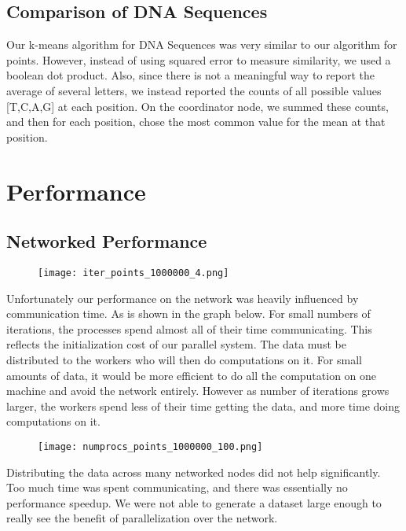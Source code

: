 \documentclass[12pt]{article}
\begin{document}
\subsection{Comparison of DNA Sequences}

Our k-means algorithm for DNA Sequences was very similar to our algorithm for points. However, instead of using squared error to measure similarity, we used a boolean dot product. Also, since there is not a meaningful way to report the average of several letters, we instead reported the counts of all possible values [T,C,A,G] at each position. On the coordinator node, we summed these counts, and then for each position, chose the most common value for the mean at that position.

\section{Performance}

\subsection{Networked Performance}

\begin{figure}[H]
\centering
\texttt{[image: iter\_points\_1000000\_4.png]}
\end{figure}


Unfortunately our performance on the network was heavily influenced by communication time. As is shown in the graph below. For small numbers of iterations, the processes spend almost all of their time communicating. This reflects the initialization cost of our parallel system. The data must be distributed to the workers who will then do computations on it. For small amounts of data, it would be more efficient to do all the computation on one machine and avoid the network entirely. However as number of iterations grows larger, the workers spend less of their time getting the data, and more time doing computations on it.



\begin{figure}[H]
\centering
\texttt{[image: numprocs\_points\_1000000\_100.png]}
\end{figure}

Distributing the data across many networked nodes did not help significantly. Too much time was spent communicating, and there was essentially no performance speedup. We were not able to generate a dataset large enough to really see the benefit of parallelization over the network.
\end{document}
